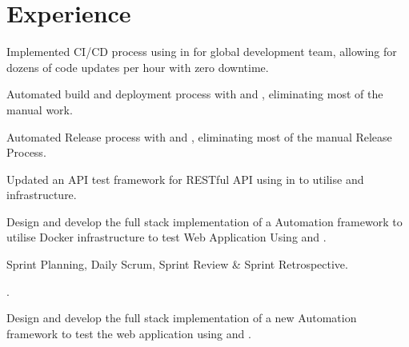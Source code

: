 \documentclass[]{openfont}
\begin{document}
\begin{minipage}[t]{0.66\textwidth} 


\section{Experience}

\vspace{\topsep} %
\begin{tightemize}
\item Implemented CI/CD process using  in  for global development team, allowing for dozens of code updates per hour with zero downtime.
\item Automated build and deployment process with  and , eliminating most of the manual work.
\item Automated Release process with  and , eliminating most of the manual Release Process.
\item Updated an API test framework for RESTful API using  in  to utilise  and  infrastructure.
\item Design and develop the full stack implementation of a Automation framework to utilise Docker infrastructure to test Web Application Using  and .
\item Sprint Planning, Daily Scrum, Sprint Review \& Sprint Retrospective.
\item {}.
\end{tightemize}
\sectionsep

\begin{tightemize}
\item Design and develop the full stack implementation of a new Automation framework to test the web application using  and .
\end{tightemize}
\sectionsep


\end{minipage}
\end{document}
